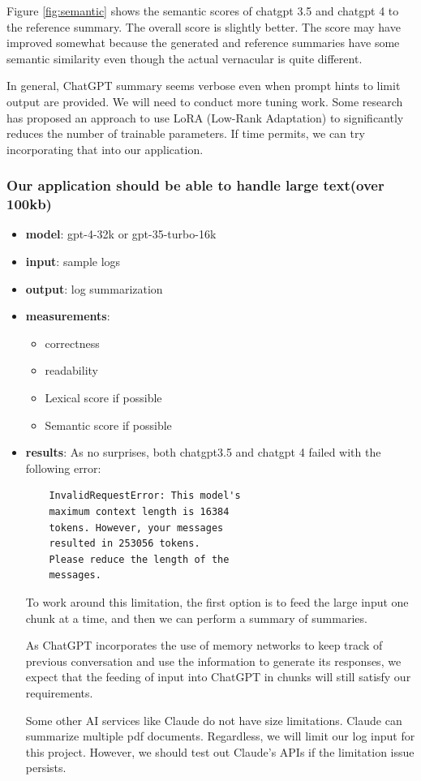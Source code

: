\documentclass[conference]{IEEEtran}
\begin{document}
\begin{itemize}
\begin{itemize}
Figure \ref{fig:semantic} shows the semantic scores of chatgpt 3.5 and chatgpt 4 to the reference summary. The overall score is slightly better. The score may have improved somewhat because the generated and reference summaries have some semantic similarity even though the actual vernacular is quite different.
   \end{itemize}
In general, ChatGPT summary seems verbose even when prompt hints to limit output are provided. We will need to conduct more tuning work. Some research has proposed an approach to use LoRA (Low-Rank Adaptation) to significantly reduces the number of trainable
parameters\cite{hu2021lora}. If time permits, we can try incorporating that into our application.
     \end{itemize}

\subsubsection{Our application should be able to handle large text(over 100kb)}
\begin{itemize}
    \item \textbf{model}: gpt-4-32k or gpt-35-turbo-16k 
    \item \textbf{input}: sample logs
    \item \textbf{output}: log summarization
    \item \textbf{measurements}:
    \begin{itemize}
        \item correctness
        \item readability
        \item Lexical score if possible
        \item Semantic score if possible
    \end{itemize}
    \item \textbf{results}:
    As no surprises, both chatgpt3.5 and chatgpt 4 failed with the following error: 
    \begin{lstlisting}
    InvalidRequestError: This model's 
    maximum context length is 16384 
    tokens. However, your messages 
    resulted in 253056 tokens. 
    Please reduce the length of the 
    messages.
    \end{lstlisting}

    To work around this limitation, the first option is to feed the large input one chunk at a time, and then we can perform a summary of summaries. 
    
    As ChatGPT incorporates the use of memory networks to keep track of previous conversation and use the information to generate its responses, we expect that the feeding of input into ChatGPT in chunks will still satisfy our requirements.

    Some other AI services like Claude do not have size limitations. Claude can summarize multiple pdf documents. Regardless, we will limit our log input for this project. However, we should test out Claude's APIs if the limitation issue persists.
    
\end{itemize}
\end{document}

